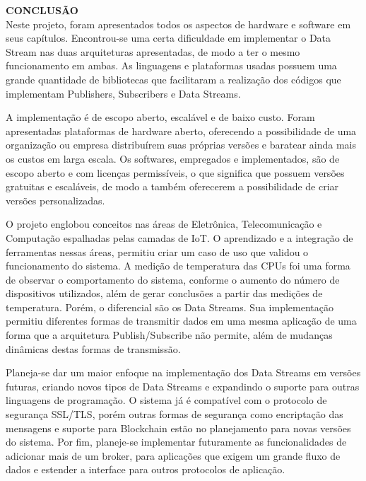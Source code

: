 \noindent\textbf{CONCLUSÃO}
$\!$\\


Neste projeto, foram apresentados todos os aspectos de hardware e software em seus capítulos. Encontrou-se uma certa dificuldade em implementar o Data Stream nas duas arquiteturas apresentadas, de modo a ter o mesmo funcionamento em ambas. As linguagens e plataformas usadas possuem uma grande quantidade de bibliotecas que facilitaram a realização dos códigos que implementam Publishers, Subscribers e Data Streams. 

A implementação é de escopo aberto, escalável e de baixo custo. Foram apresentadas plataformas de hardware aberto, oferecendo a possibilidade de uma organização ou empresa distribuírem suas próprias versões e baratear ainda mais os custos em larga escala. Os softwares, empregados e implementados, são de escopo aberto e com licenças permissíveis, o que significa que possuem versões gratuitas e escaláveis, de modo a também oferecerem a possibilidade de criar versões personalizadas.

O projeto englobou conceitos nas áreas de Eletrônica, Telecomunicação e Computação espalhadas pelas camadas de IoT. O aprendizado e a integração de ferramentas nessas áreas, permitiu criar um caso de uso que validou o funcionamento do sistema. A medição de temperatura das CPUs foi uma forma de observar o comportamento do sistema, conforme o aumento do número de dispositivos utilizados, além de gerar conclusões a partir das medições de temperatura. Porém, o diferencial são os Data Streams. Sua implementação permitiu diferentes formas de transmitir dados em uma mesma aplicação de uma forma que a arquitetura Publish/Subscribe não permite, além de mudanças dinâmicas destas formas de transmissão.

Planeja-se dar um maior enfoque na implementação dos Data Streams em versões futuras, criando novos tipos de Data Streams e expandindo o suporte para outras linguagens de programação. O sistema já é compatível com o protocolo de segurança SSL/TLS, porém outras formas de segurança como encriptação das mensagens e suporte para Blockchain estão no planejamento para novas versões do sistema. Por fim, planeje-se implementar futuramente as funcionalidades de adicionar mais de um broker, para aplicações que exigem um grande fluxo de dados e estender a interface para outros protocolos de aplicação.


\pagebreak



